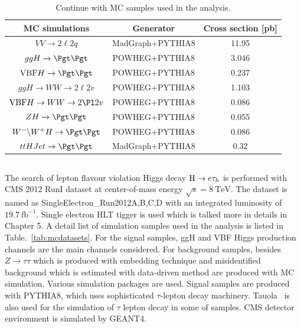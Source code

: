 \begin{table}[!hbpt]
\caption{Continue with MC samples used in the analysis.}
\begin{center}
\begin{tabular}{|c|c|c|}
\hline
MC simulations & Generator & Cross section [pb] \\\hline
$VV \to2\ell 2 q$                                        &  MadGraph+PYTHIA8   &  11.95  \\\hline
$ggH\to \Pgt\Pgt $                                      & POWHEG+PYTHIA8 &      3.046\\\hline
$\textrm{VBF}H\to \Pgt\Pgt $                     & POWHEG+PYTHIA8 &      0.237\\\hline
$ggH\to WW \to 2\ell 2v$                            & POWHEG+PYTHIA8 &      1.103\\\hline
$\textrm{VBF}H\to WW\to 2\Pl 2v$             & POWHEG+PYTHIA8 &    0.086\\\hline
$ZH \to \Pgt\Pgt$                                        & POWHEG+PYTHIA8 &    0.055\\\hline  
$W^{-}\backslash W^{+} H\to\Pgt\Pgt$        & POWHEG+PYTHIA8 &    0.086\\\hline 
$ttHJet \to \Pgt\Pgt$                                   &MadGraph+PYTHIA8&     0.32\\\hline   
\end{tabular}
\end{center}
\label{tab:mutaumcsamples2}
\end{table}


\subsection{\Hehad}

The search of lepton flavour violation Higgs decay $\mathrm{H} \to e \tau_{h}$  is performed with CMS 2012 RunI dataset at center-of-mass energy  $\sqrt{s}=8 ~\textrm{TeV}$. The dataset is named as SingleElectron\_Run2012A,B,C,D with an integrated luminosity of $19.7 ~\textrm{fb}^{-1}$. Single electron HLT tigger is used which is talked more in details in Chapter 5. A detail list of simulation samples used in the analysis is listed in Table.~\ref{tab:mcdatasets}.  For the signal samples, ggH and VBF Higgs production channels are the main channels considered. For background samples, besides $Z\to \tau \tau$ which is produced with embedding technique and misidentified background which is estimated with data-driven method are produced with MC simulation. Various simulation packages are used. Signal samples are produced with PYTHIA8, which uses sophisticated $\tau$-lepton decay machinery. Tauola~\cite{Simulation:Tauola} is also used for the simulation of $\tau$ lepton decay in some of samples. CMS detector environment is simulated by GEANT4. 



